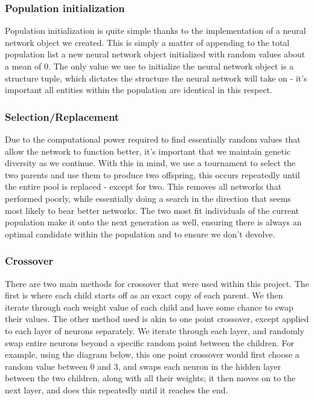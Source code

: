\documentclass[12pt]{report}
\begin{document}
\subsubsection*{Population initialization}
Population initialization is quite simple thanks to the implementation of a neural network object we
created. This is simply a matter of appending to the total population list a
new neural network object initialized with random values about a mean of 0. The only value we
use to initialize the neural network object is a structure tuple, which dictates
the structure the neural network will take on - it's important all entities within
the population are identical in this respect.

\subsubsection*{Selection/Replacement}
Due to the computational power required to find essentially random
values that allow the network to function better, it's important that we
maintain genetic diversity as we continue. With this in mind, we use a tournament to select the two parents and use them to produce two
offspring, this occurs repeatedly until the entire
pool is replaced - except for two. This removes all networks that performed poorly, while essentially doing
a search in the direction that seems most likely to bear better networks. The two most fit individuals of 
the current population make it onto the next generation as well, ensuring 
there is always an optimal candidate within the population and to ensure we don't devolve.  
 
\subsubsection*{Crossover}
There are two main methods for crossover that were used within this project.
The first is where each child starts off as an exact copy of each parent. We then iterate through each
weight value of each child and have some chance to swap their values. The other method used
is akin to one point crossover, except applied to each layer of neurons separately. We 
iterate through each layer, and randomly swap entire neurons beyond a specific random
point between the children. For example, using the diagram below, this one point crossover
would first choose a random value between 0 and 3, and swaps each neuron in the hidden layer
between the two children, along with all their weights; it then moves on to the next layer, and
does this repeatedly until it reaches the end.
\end{document}
